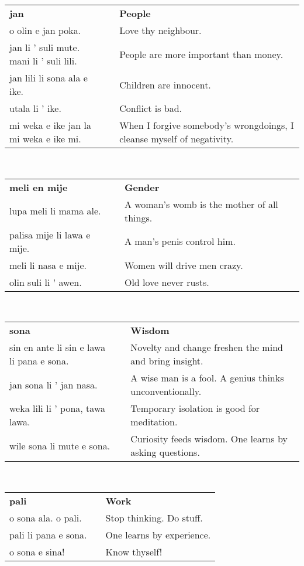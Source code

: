 %
\begin{supertabular}{p{6cm}|ll}
\textbf{jan} && \textbf{People} \\
o olin e jan poka.  && Love thy neighbour.  \\
jan li ' suli mute. mani li ' suli lili.  && People are more important than money. \\ 
jan lili li sona ala e ike.  && Children are innocent.  \\
utala li ' ike.  && Conflict is bad.  \\
mi weka e ike jan la mi weka e ike mi. && When I forgive somebody's wrongdoings, I cleanse myself of negativity.  \\
\end{supertabular} \\
%
\begin{supertabular}{p{6cm}|ll}
\textbf{meli en mije} && \textbf{Gender} \\
lupa meli li mama ale.  && A woman's womb is the mother of all things.  \\
palisa mije li lawa e mije.  && A man's penis control him.  \\
meli li nasa e mije. && Women will drive men crazy.  \\
olin suli li ' awen. && Old love never rusts. \\
\end{supertabular} \\
%
\begin{supertabular}{p{6cm}|ll}
\textbf{sona} && \textbf{Wisdom} \\
sin en ante li sin e lawa li pana e sona. && Novelty and change freshen the mind and bring insight. \\ 
jan sona li ' jan nasa.  && A wise man is a fool. A genius thinks unconventionally.  \\
weka lili li ' pona, tawa lawa. && Temporary isolation is good for meditation. \\ 
wile sona li mute e sona.  && Curiosity feeds wisdom. One learns by asking questions.  \\ 
\end{supertabular} \\
%
\begin{supertabular}{p{6cm}|ll}
\textbf{pali} && \textbf{Work} \\
o sona ala. o pali.  && Stop thinking. Do stuff.  \\
pali li pana e sona.  && One learns by experience.  \\
o sona e sina!  && Know thyself!  \\
\end{supertabular} \\
